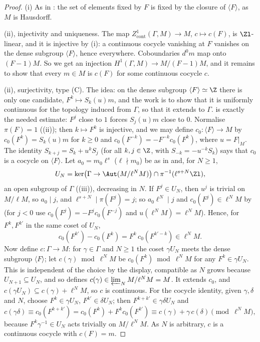 \begin{proof}
(i) As in : the set of elements fixed by $F$ is fixed by the closure of $\langle F\rangle$, as $M$ is Hausdorff.

(ii), injectivity and uniqueness. The map $Z^1_{\mathrm{cont}}(\Gamma,M)\to M$, $c\mapsto c(F)$, is $\Zl$-linear, and it is injective by (i): a
continuous cocycle vanishing at $F$ vanishes on the dense subgroup $\langle F\rangle$, hence everywhere. Coboundaries $d^0m$ map onto $(F-1)M$. So we get an injection
$H^1(\Gamma,M)\to M/(F-1)M$, and it remains to show that every $m\in M$ is $c(F)$ for some continuous cocycle $c$.

(ii), surjectivity, type (C). The idea: on the dense subgroup $\langle F\rangle\simeq\Z$ there is only one candidate, $F^k\mapsto S_k(u)m$, and the work is to
show that it is uniformly continuous for the topology induced from $\Gamma$, so that it extends to $\Gamma$.  is exactly the
needed estimate: $F^j$ close to $1$ forces $S_j(u)m$ close to $0$. Normalise $\pi(F)=1$ ((ii)); then $k\mapsto F^k$ is injective, and we may define
$c_0\colon\langle F\rangle\to M$ by $c_0(F^k)=S_k(u)m$ for $k\ge0$ and $c_0(F^{-k})=-F^{-k}c_0(F^k)$, where $u=F|_M$. The identity $S_{k+j}=S_k+u^kS_j$ (for all $k,j\in\Z$, with
$S_{-k}=-u^{-k}S_k$) says that $c_0$ is a cocycle on $\langle F\rangle$. Let $a_0=m_0\ell^s$ ($\ell\nmid m_0$) be as in  and, for $N\ge1$,
\[
U_N=\ker\bigl(\Gamma\to\Aut(M/\ell^NM)\bigr)\cap\pi^{-1}(\ell^{s+N}\Zl),
\]
an open subgroup of $\Gamma$ ((iii)), decreasing in $N$. If $F^j\in U_N$, then $u^j$ is trivial on $M/\ell M$, so $a_0\mid j$, and
$\ell^{s+N}\mid\pi(F^j)=j$; so $a_0\ell^N\mid j$ and $c_0(F^j)\in\ell^NM$ by  (for $j<0$ use $c_0(F^{j})=-F^{j}c_0(F^{-j})$ and $u(\ell^NM)=\ell^NM$).
Hence, for $F^k,F^{k'}$ in the same coset of $U_N$,
\[
c_0(F^{k'})-c_0(F^k)=F^k\,c_0(F^{k'-k})\in\ell^NM .
\]
Now define $c\colon\Gamma\to M$: for $\gamma\in\Gamma$ and $N\ge1$ the coset $\gamma U_N$ meets the dense subgroup $\langle F\rangle$; let $c(\gamma)\bmod\ell^NM$ be $c_0(F^k)\bmod\ell^NM$ for
any $F^k\in\gamma U_N$. This is independent of the choice by the display, compatible as $N$ grows because $U_{N+1}\subseteq U_N$, and so defines
$c(\gamma)\in\varprojlim_NM/\ell^NM=M$. It extends $c_0$, and $c(\gamma U_N)\subseteq c(\gamma)+\ell^NM$, so $c$ is continuous. For the cocycle identity, given $\gamma,\delta$ and $N$,
choose $F^k\in\gamma U_N$, $F^{k'}\in\delta U_N$; then $F^{k+k'}\in\gamma\delta U_N$ and
\[
c(\gamma\delta)\equiv c_0(F^{k+k'})=c_0(F^k)+F^kc_0(F^{k'})\equiv c(\gamma)+\gamma\,c(\delta)\pmod{\ell^NM},
\]
because $F^k\gamma^{-1}\in U_N$ acts trivially on $M/\ell^NM$. As $N$ is arbitrary, $c$ is a continuous cocycle with $c(F)=m$.


\end{proof}
